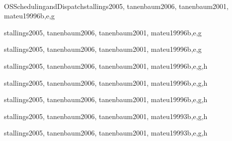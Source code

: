 \begin{syllabus}
\begin{unit}{\\OSSchedulingandDispatch}{}{stallings2005, tanenbaum2006, tanenbaum2001, mateu1999}{6}{b,e,g}
    \OSSchedulingandDispatchAllTopics
    \OSSchedulingandDispatchAllLearningOutcomes
\end{unit}

\begin{unit}{\OSMemoryManagement}{}{stallings2005, tanenbaum2006, tanenbaum2001, mateu1999}{6}{b,e,g}
    \OSMemoryManagementAllTopics
    \OSMemoryManagementAllLearningOutcomes
\end{unit}

\begin{unit}{\OSDeviceManagement}{}{stallings2005, tanenbaum2006, tanenbaum2001, mateu1999}{6}{b,e,g}
    \OSDeviceManagementAllTopics
    \OSDeviceManagementAllLearningOutcomes
\end{unit}

\begin{unit}{\OSSecurityandProtection}{}{stallings2005, tanenbaum2006, tanenbaum2001, mateu1999}{6}{b,e,g,h}
    \OSSecurityandProtectionAllTopics
    \OSSecurityandProtectionAllLearningOutcomes
\end{unit}

\begin{unit}{\OSFileSystems}{}{stallings2005, tanenbaum2006, tanenbaum2001, mateu1999}{6}{b,e,g,h}
    \OSFileSystemsAllTopics
    \OSFileSystemsAllLearningOutcomes
\end{unit}

\begin{unit}{\OSRealTimeandEmbeddedSystems}{}{stallings2005, tanenbaum2006, tanenbaum2001, mateu1999}{6}{b,e,g,h}
    \OSRealTimeandEmbeddedSystemsAllTopics
    \OSRealTimeandEmbeddedSystemsAllLearningOutcomes
\end{unit}

\begin{unit}{\OSFaultTolerance}{}{stallings2005, tanenbaum2006, tanenbaum2001, mateu1999}{3}{b,e,g,h}
    \OSFaultToleranceAllTopics
    \OSFaultToleranceAllLearningOutcomes
\end{unit}

\begin{unit}{\OSSystemPerformanceEvaluation}{}{stallings2005, tanenbaum2006, tanenbaum2001, mateu1999}{3}{b,e,g,h}
        \OSSystemPerformanceEvaluationAllTopics
        \OSSystemPerformanceEvaluationAllLearningOutcomes
    \end{unit}



\begin{coursebibliography}
\end{coursebibliography}

\end{syllabus}

